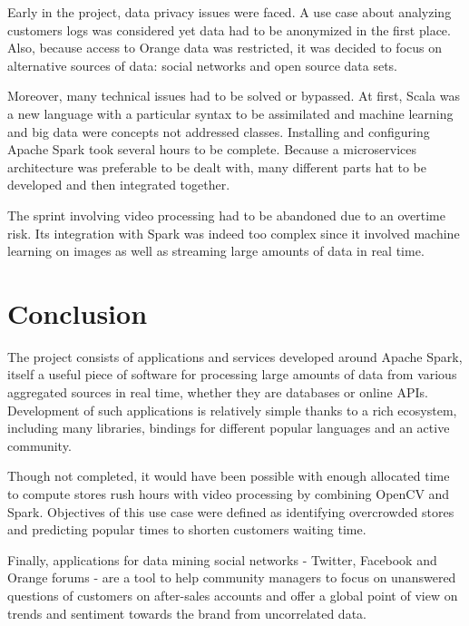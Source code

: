 \documentclass[11pt]{article}
\begin{document}
Early in the project, data privacy issues were faced. A use case about analyzing customers logs was considered yet data had to be anonymized in the first place. Also, because access to \textsf{Orange} data was restricted, it was decided to focus on alternative sources of data: social networks and open source data sets.

Moreover, many technical issues had to be solved or bypassed. At first, \textsf{Scala} was a new language with a particular syntax to be assimilated and machine learning and big data were concepts not addressed classes. Installing and configuring \textsf{Apache Spark} took several hours to be complete. Because a microservices architecture was preferable to be dealt with, many different parts hat to be developed and then integrated together.

The sprint involving video processing had to be abandoned due to an overtime risk. Its integration with \textsf{Spark} was indeed too complex since it involved machine learning on images as well as streaming large amounts of data in real time.

\section{Conclusion}

The project consists of applications and services developed around \textsf{Apache Spark}, itself a useful piece of software for processing large amounts of data from various aggregated sources in real time, whether they are databases or online APIs. Development of such applications is relatively simple thanks to a rich ecosystem, including many libraries, bindings for different popular languages and an active community.
\vspace{4pt}

Though not completed, it would have been possible with enough allocated time to compute stores rush hours with video processing by combining \textsf{OpenCV} and \textsf{Spark}. Objectives of this use case were defined as identifying overcrowded stores and predicting popular times to shorten customers waiting time.
\vspace{4pt}

Finally, applications for data mining social networks - \textsf{Twitter}, \textsf{Facebook} and \textsf{Orange} forums - are a tool to help community managers to focus on unanswered questions of customers on after-sales accounts and offer a global point of view on trends and sentiment towards the brand from uncorrelated data.
\vspace{4pt}
\end{document}
